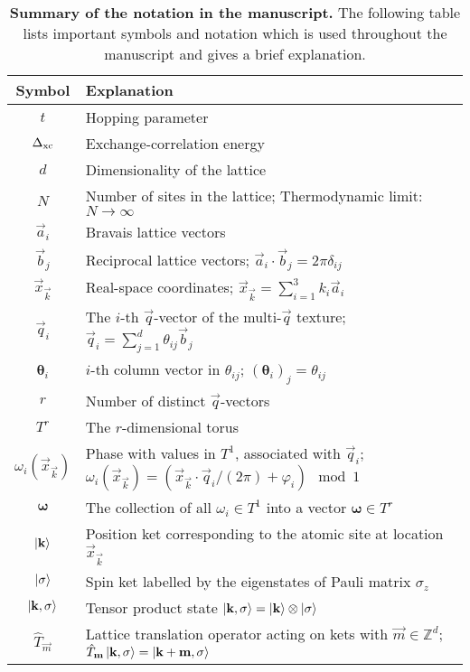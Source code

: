 \documentclass[
    aps,
    prb,
    twocolumn,
    floatfix,
    superscriptaddress,
	10pt
]{revtex4-2}
\begin{document}
\begin{table*}[t!]
	\centering
	\caption{{\bf Summary of the notation in the manuscript.} 
	The following table lists important symbols and notation which is used throughout the manuscript and gives a brief explanation.
	}
	\label{tab:notation}\vspace{0.2cm}
	\begin{tabular}{c|p{15cm}}
	 Symbol  & Explanation \\ \toprule
	$t$      & Hopping parameter \\
	$\Delta_\mathrm{xc}$    & Exchange-correlation energy \\
	$d$      & Dimensionality of the lattice \\
	$N$      & Number of sites in the lattice; Thermodynamic limit: $N\to\infty$ \\
	$\vec{a}_i$ & Bravais lattice vectors \\
	$\vec{b}_j$ & Reciprocal lattice vectors; $\vec{a}_i \cdot \vec{b}_j = 2\pi \delta_{ij}$ \\
	$\vec{x}_{\vec{k}}$ &  Real-space coordinates; $\vec{x}_{\vec{k}} = \sum_{i=1}^3 k_i \vec{a}_i $ \\
	$\vec{q}_i$ & The $i$-th $\vec{q}$-vector of the multi-$\vec{q}$ texture; 
	$\vec{q}_i = \sum_{j=1}^d \theta_{ij} \vec{b}_j$ \\
	$ \boldsymbol{\theta}_i$ & $i$-th column vector in $\theta_{ij}$;  $(\boldsymbol{\theta}_i)_j = \theta_{ij}$ \\
	$ r $  & Number of distinct $\vec{q}$-vectors \\
	$ T^r $ & The $r$-dimensional torus \\ 
	$ \omega_i (\vec{x}_\vec{k}) $ & Phase with values in $T^1$, associated with $\vec{q}_i$; $ \omega_i (\vec{x}_\vec{k}) =  (\vec{x}_\vec{k}  \cdot \vec{q}_i/ (2\pi) + \varphi_i) \mod 1 $ \\
	$\boldsymbol{\omega}$ & The collection of all $\omega_i \in T^1$ into a vector $\boldsymbol{\omega}\in T^r$ \\ 
	$\ket{\mathbf{k}} $ & Position ket corresponding to the atomic site at location $\vec{x}_\vec{k}$ \\
	$ \ket{\sigma} $ & Spin ket labelled by the eigenstates of Pauli matrix $\sigma_z$ \\
	$ \ket{\mathbf{k}, \sigma} $ & Tensor product state $ \ket{\mathbf{k}, \sigma} = \ket{\mathbf{k}} \otimes \ket{\sigma}$ \\
	$\hat{T}_{\vec{m}}$ & Lattice translation operator acting on kets with $\vec{m}\in \mathbb{Z}^d$; $  \hat{T}_{\mathbf{m}} \ket{\mathbf{k}, \sigma}  =  \ket{\mathbf{k}+ \mathbf{m}, \sigma}$ \\

\end{tabular}
\end{table*}
\end{document}
